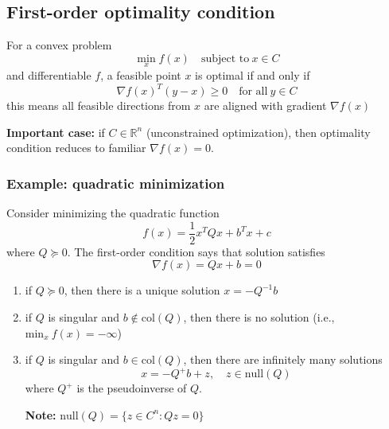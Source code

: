 \documentclass[a4paper]{article}
\begin{document}
{\subsection{First-order optimality condition}
\begin{defi}
  For a convex problem
  \[
    \min_x f(x) \quad \text{subject to} \ x \in C
  \]
  and differentiable $f$, a feasible point $x$ is optimal if and only if 
  \[
    \nabla f(x)^T (y-x)\geq 0  \quad \text{for all} \ y \in C
  \]
this means all feasible directions from $x$ are aligned with gradient $\nabla f(x)$
\end{defi}

\noindent \textbf{Important case:} if $C \in \mathbb{R}^n$ (unconstrained optimization), then optimality condition reduces to familiar $\nabla f(x) = 0$.

\subsubsection{Example: quadratic minimization}
Consider minimizing the quadratic function
\begin{equation}
  f(x) = \frac{1}{2}x^T Q x + b^T x + c \nonumber
\end{equation}
where $Q \succeq 0$. The first-order condition says that solution satisfies
\begin{equation}
  \nabla f(x) = Q x + b = 0 \nonumber
\end{equation}
\begin{enumerate}
  \item if $Q \succeq 0$, then there is a unique solution $x = -Q ^{-1}b$
  \item if $Q $ is singular and $b \notin \text{col}(Q)$, then there is no solution (i.e., $\text{min}_x \ f(x) = - \infty$)
  \item if $Q $ is singular and $b \in \text{col}(Q)$, then there are infinitely many solutions
  \begin{equation}
    x = -Q^+ b + z, \quad z \in \text{null}(Q) \nonumber
  \end{equation}
  where $Q^+$ is the pseudoinverse of $Q$. 
  
  \textbf{Note:} $\text{null}(Q) = \{z \in C^n : Qz = 0 \} $
\end{enumerate}

}
\end{document}
